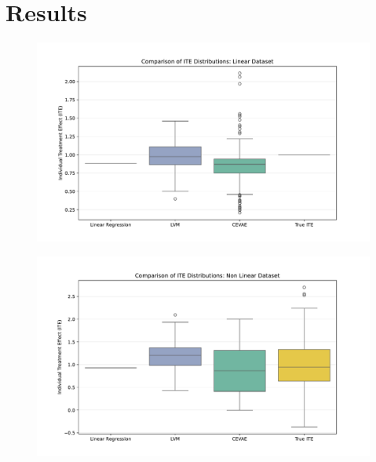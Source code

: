 \documentclass[10pt]{beamer}
\begin{document}

 \section{Results}

\begin{frame}{}
    \begin{figure}[H]
      \includegraphics[width=\textwidth]{images/boxplot_linear.pdf}
    \end{figure}
\end{frame}

\begin{frame}{}
    \begin{figure}[H]
      \includegraphics[width=\textwidth]{images/boxplot_non_linear.pdf}
    \end{figure}
\end{frame}

\end{document}
